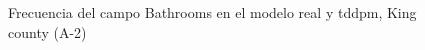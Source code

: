 \begin{figure}[H]
    \centering
    
    \caption{Frecuencia del campo Bathrooms en el modelo real y tddpm, King county (A-2)}
    \label{frecuency-tddpm-bathrooms}
\end{figure}